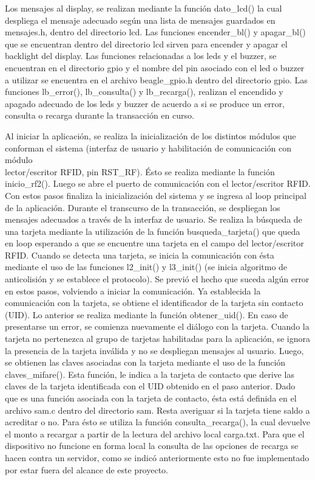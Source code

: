 \bigskip
Los mensajes al display, se realizan mediante la función dato\_lcd() la cual despliega el mensaje adecuado según una lista de mensajes guardados en mensajes.h, dentro del directorio lcd. Las funciones encender\_bl() y apagar\_bl() que se encuentran dentro del directorio lcd sirven para encender y apagar el backlight del display.
Las funciones relacionadas a los leds y el buzzer, se encuentran en el directorio gpio y el nombre del pin asociado con el led o buzzer a utilizar se encuentra en el archivo beagle\_gpio.h dentro del directorio gpio. Las funciones lb\_error(), lb\_consulta() y lb\_recarga(), realizan el encendido y apagado adecuado de los leds y buzzer de acuerdo a si se produce un error, consulta o recarga durante la transacción en curso.
 
\bigskip
Al iniciar la aplicación, se realiza la inicialización de los distintos módulos que conforman el sistema (interfaz de usuario y habilitación de comunicación con módulo\\
 lector/escritor RFID, pin RST\_RF). Ésto se realiza mediante la función inicio\_rf2(). Luego se abre el puerto de comunicación con el lector/escritor RFID. Con estos pasos finaliza la inicialización del sistema y se ingresa al loop principal de la aplicación.
Durante el transcurso de la transacción, se despliegan los mensajes adecuados a través de la interfaz de usuario.
Se realiza la búsqueda de una tarjeta mediante la utilización de la función busqueda\_tarjeta() que queda en loop esperando a que se encuentre una tarjeta en el campo del lector/escritor RFID.
Cuando se detecta una tarjeta, se inicia la comunicación con ésta mediante el uso de las funciones l2\_init() y l3\_init() (se inicia algoritmo de anticolisión y se establece el protocolo). Se previó el hecho que suceda algún error en estos pasos, volviendo a iniciar la comunicación.
Ya establecida la comunicación con la tarjeta, se obtiene el identificador de la tarjeta sin contacto (UID). Lo anterior se realiza mediante la función obtener\_uid(). En caso de presentarse un error, se comienza nuevamente el diálogo con la tarjeta. Cuando la tarjeta no pertenezca al grupo de tarjetas habilitadas para la aplicación, se ignora la presencia de la tarjeta inválida y no se despliegan mensajes al usuario.
Luego, se obtienen las claves asociadas con la tarjeta mediante el uso de la función claves\_mifare(). Esta función, le indica a la tarjeta de contacto que derive las claves de la tarjeta identificada con el UID obtenido en el paso anterior. Dado que es una función asociada con la tarjeta de contacto, ésta está definida en el archivo sam.c dentro del directorio sam.
Resta averiguar si la tarjeta tiene saldo a acreditar o no. Para ésto se utiliza la función consulta\_recarga(), la cual devuelve el monto a recargar a partir de la lectura del archivo local carga.txt. Para que el dispositivo no funcione en forma local la consulta de las opciones de recarga se hacen contra un servidor, como se indicó anteriormente esto no fue implementado por estar fuera del alcance de este proyecto.

